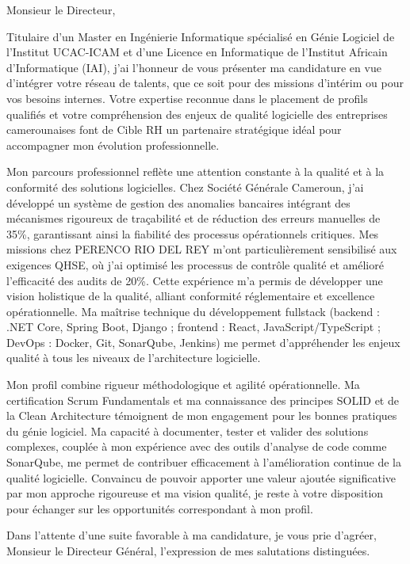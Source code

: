 \documentclass[11pt, a4paper]{../../../awesome-cv}
\begin{document}
\begin{cvletter}



Monsieur le Directeur,

\setlength{\parindent}{2em}  %

\indent Titulaire d'un Master en Ingénierie Informatique spécialisé en Génie Logiciel de l'Institut UCAC-ICAM et d'une Licence en Informatique de l'Institut Africain d'Informatique (IAI), j'ai l'honneur de vous présenter ma candidature en vue d'intégrer votre réseau de talents, que ce soit pour des missions d'intérim ou pour vos besoins internes. Votre expertise reconnue dans le placement de profils qualifiés et votre compréhension des enjeux de qualité logicielle des entreprises camerounaises font de Cible RH un partenaire stratégique idéal pour accompagner mon évolution professionnelle.

\indent Mon parcours professionnel reflète une attention constante à la qualité et à la conformité des solutions logicielles. Chez Société Générale Cameroun, j'ai développé un système de gestion des anomalies bancaires intégrant des mécanismes rigoureux de traçabilité et de réduction des erreurs manuelles de 35\%, garantissant ainsi la fiabilité des processus opérationnels critiques. Mes missions chez PERENCO RIO DEL REY m'ont particulièrement sensibilisé aux exigences QHSE, où j'ai optimisé les processus de contrôle qualité et amélioré l'efficacité des audits de 20\%. Cette expérience m'a permis de développer une vision holistique de la qualité, alliant conformité réglementaire et excellence opérationnelle. Ma maîtrise technique du développement fullstack (backend : .NET Core, Spring Boot, Django ; frontend : React, JavaScript/TypeScript ; DevOps : Docker, Git, SonarQube, Jenkins) me permet d'appréhender les enjeux qualité à tous les niveaux de l'architecture logicielle.

\indent Mon profil combine rigueur méthodologique et agilité opérationnelle. Ma certification Scrum Fundamentals et ma connaissance des principes SOLID et de la Clean Architecture témoignent de mon engagement pour les bonnes pratiques du génie logiciel. Ma capacité à documenter, tester et valider des solutions complexes, couplée à mon expérience avec des outils d'analyse de code comme SonarQube, me permet de contribuer efficacement à l'amélioration continue de la qualité logicielle. Convaincu de pouvoir apporter une valeur ajoutée significative par mon approche rigoureuse et ma vision qualité, je reste à votre disposition pour échanger sur les opportunités correspondant à mon profil.

Dans l'attente d'une suite favorable à ma candidature, je vous prie d'agréer, Monsieur le Directeur Général, l'expression de mes salutations distinguées.

\end{cvletter}

\makeletterclosing
\end{document}
